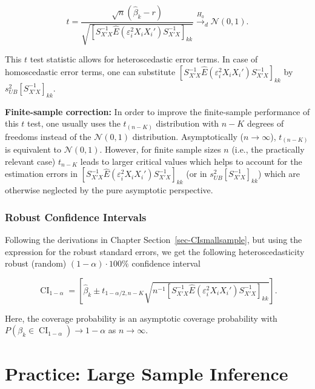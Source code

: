 \documentclass[
  letterpaper,
  DIV=11,
  numbers=noendperiod]{scrreprt}
\theoremstyle{definition}
\theoremstyle{plain}
\theoremstyle{plain}
\theoremstyle{remark}
\begin{document}
{\[
t=\frac{\sqrt{n}\left(\hat{\beta}_k-r\right)}{\sqrt{\left[S_{X'X}^{-1}\widehat{E}(\varepsilon^2_iX_iX_i')S^{-1}_{X'X}\right]_{kk}}}\overset{H_0}{\to}_d\mathcal{N}(0,1).
\]

This \(t\) test statistic allows for heteroscedastic error terms. In
case of homoscedastic error terms, one can substitute
\([S_{X'X}^{-1}\widehat{E}(\varepsilon^2_iX_iX_i')S^{-1}_{X'X}]_{kk}\)
by \(s_{UB}^2[S_{X'X}^{-1}]_{kk}\).

\textbf{Finite-sample correction:} In order to improve the finite-sample
performance of this \(t\) test, one usually uses the \(t_{(n-K)}\)
distribution with \(n-K\) degrees of freedoms instead of the
\(\mathcal{N}(0,1)\) distribution. Asymptotically (\(n\to\infty\)),
\(t_{(n-K)}\) is equivalent to \(\mathcal{N}(0,1)\). However, for finite
sample sizes \(n\) (i.e., the practically relevant case) \(t_{n-K}\)
leads to larger critical values which helps to account for the
estimation errors in
\([S_{X'X}^{-1}\widehat{E}(\varepsilon^2_iX_iX_i')S^{-1}_{X'X}]_{kk}\)
(or in \(s_{UB}^2[S_{X'X}^{-1}]_{kk}\)) which are otherwise neglected by
the pure asymptotic perspective.

\hypertarget{robust-confidence-intervals}{%
\subsubsection{Robust Confidence
Intervals}\label{robust-confidence-intervals}}

Following the derivations in Chapter Section~\ref{sec-CIsmallsample},
but using the expression for the robust standard errors, we get the
following heteroscedasticity robust (random) \((1-\alpha)\cdot 100\%\)
confidence interval

\[
\operatorname{CI}_{1-\alpha}=
\left[\hat\beta_k\pm t_{1-\alpha/2,n-K}\sqrt{n^{-1}[S_{X'X}^{-1}\widehat{E}(\varepsilon^2_iX_iX_i')S^{-1}_{X'X}]_{kk}}\right].
\]

Here, the coverage probability is an asymptotic coverage probability
with \(P(\beta_k\in\operatorname{CI}_{1-\alpha})\to 1-\alpha\) as
\(n\to\infty\).

\hypertarget{practice-large-sample-inference}{%
\section{Practice: Large Sample
Inference}\label{practice-large-sample-inference}}

}
\end{document}
